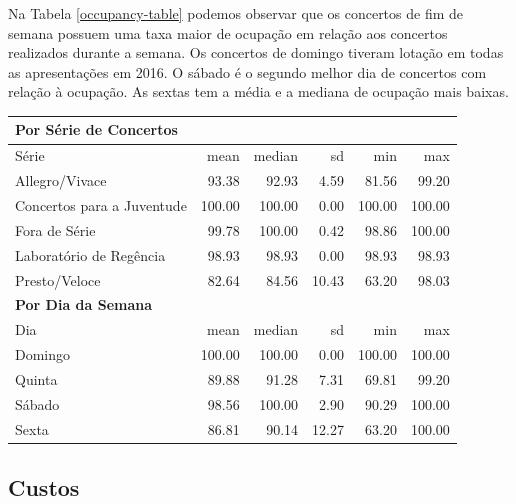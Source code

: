 \documentclass[a4paper, 12pt, openright, oneside, german, french, english, brazil]{abntex2}
\begin{document}
	
	
	Na Tabela \ref{occupancy-table} podemos observar que os concertos de fim de semana possuem uma taxa maior de ocupação em relação aos concertos realizados durante a semana. Os concertos de domingo tiveram lotação em todas as apresentações em 2016. O sábado é o segundo melhor dia de concertos com relação à ocupação. As sextas tem a média e a mediana de ocupação mais baixas.
	
	\begin{table}[!h]
		{\begin{tabular}{lrrrrr}
				\hline
				\multicolumn{6}{l}{\textbf{Por Série de Concertos}} \\
				\hline
				Série & mean & median & sd & min & max \\ 
				\hline
				Allegro/Vivace & 93.38 & 92.93 & 4.59 & 81.56 & 99.20 \\ 
				Concertos para a Juventude & 100.00 & 100.00 & 0.00 & 100.00 & 100.00 \\ 
				Fora de Série & 99.78 & 100.00 & 0.42 & 98.86 & 100.00 \\
				Laboratório de Regência & 98.93 & 98.93 & 0.00 & 98.93 & 98.93 \\ 
				Presto/Veloce & 82.64 & 84.56 & 10.43 & 63.20 & 98.03 \\ 
				\hline
				\multicolumn{6}{l}{\textbf{Por Dia da Semana}} \\
				\hline
				Dia  & mean & median & sd & min & max \\
				\hline
				Domingo  & 100.00 & 100.00 & 0.00 & 100.00 & 100.00 \\ 
				Quinta & 89.88 & 91.28 & 7.31 & 69.81 & 99.20 \\ 
				Sábado & 98.56 & 100.00 & 2.90 & 90.29 & 100.00 \\  
				Sexta & 86.81 & 90.14 & 12.27 & 63.20 & 100.00 \\ 
				\hline
			\end{tabular}
		}
		{}
	\end{table}
	
	
	
	\subsection{Custos}
	
\end{document}

